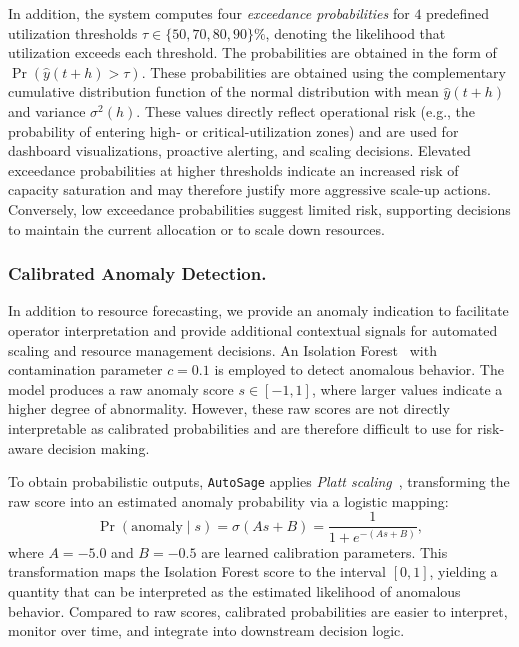 \documentclass[sigconf]{acmart}
\newcommand{\Solution}{\texttt{AutoSage}}
\begin{document}
In addition, the system computes four \emph{exceedance probabilities} for $4$ predefined utilization thresholds $\tau \in \{50, 70, 80, 90 \}\%$, denoting the likelihood that utilization exceeds each threshold. The probabilities are obtained in the form of $\Pr\!\left(\hat{y}(t+h) > \tau\right)$.
These probabilities are obtained using the complementary cumulative distribution function of the normal distribution with mean $\hat{y}(t+h)$ and variance $\sigma^2(h)$. %
These values directly reflect operational risk (e.g., the probability of entering high- or critical-utilization zones) and are used for dashboard visualizations, proactive alerting, and scaling decisions.
Elevated exceedance probabilities at higher thresholds indicate an increased risk of capacity saturation and may therefore justify more aggressive scale-up actions. Conversely, low exceedance probabilities suggest limited risk, supporting decisions to maintain the current allocation or to scale down resources.

\subsubsection{Calibrated Anomaly Detection.}

In addition to resource forecasting, we provide an anomaly indication to facilitate operator interpretation and provide additional contextual signals for automated scaling and resource management decisions.
%
An Isolation Forest~\cite{liu2008isolation} with contamination parameter
$c = 0.1$ is employed to detect anomalous behavior. The model produces a
raw anomaly score $s \in [-1,1]$, where larger values indicate a higher
degree of abnormality. However, these raw scores are not directly
interpretable as calibrated probabilities and are therefore difficult to
use for risk-aware decision making.

To obtain probabilistic outputs, \Solution{} applies \emph{Platt scaling}~\cite{platt1999probabilistic}, transforming the raw score into an estimated anomaly probability via a logistic mapping:
\begin{equation}\label{eq:platt}
  \Pr(\text{anomaly} \mid s) = \sigma(As + B)
    = \frac{1}{1 + e^{-(As + B)}},
\end{equation}
where $A = -5.0$ and $B = -0.5$ are learned calibration parameters. This transformation maps the Isolation Forest score to the interval $[0,1]$, yielding a quantity that can be interpreted as the estimated likelihood of anomalous behavior. Compared to raw scores, calibrated probabilities are easier to interpret, monitor over time, and integrate into downstream decision logic.
\end{document}

